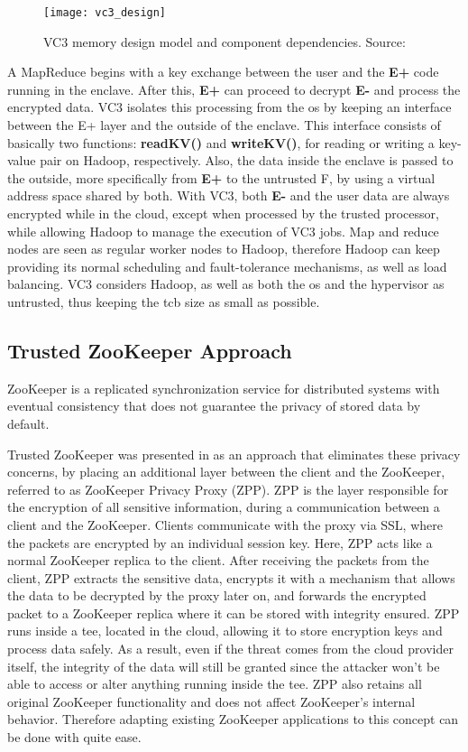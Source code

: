 \begin{figure}[tbp]
	\centering
	{\texttt{[image: vc3\_design]}}
	\caption{VC3 memory design model and component dependencies. Source: \cite{vc3Paper}}
\end{figure}

A MapReduce begins with a key exchange between the user and the \textbf{E+} code running in the enclave. After this, \textbf{E+} can proceed to decrypt \textbf{E-} and process the encrypted data. VC3 isolates this processing from the \gls{os} by keeping an interface between the E+ layer and the outside of the enclave. This interface consists of basically two functions: \textbf{readKV()} and \textbf{writeKV()}, for reading or writing a key-value pair on Hadoop, respectively. Also, the data inside the enclave is passed to the outside, more specifically from \textbf{E+} to the untrusted F, by using a virtual address space shared by both.
With VC3, both \textbf{E-} and the user data are always encrypted while in the cloud, except when processed by the trusted processor, while allowing Hadoop to manage the execution of VC3 jobs. Map and reduce nodes are seen as regular worker nodes to Hadoop, therefore Hadoop can keep providing its normal scheduling and fault-tolerance mechanisms, as well as load balancing. VC3 considers Hadoop, as well as both the \gls{os} and the hypervisor as untrusted, thus keeping the \gls{tcb} size as small as possible.

\subsection{Trusted ZooKeeper Approach}
\label{ssec:protected_zookeeper}

ZooKeeper \cite{zookeeper} is a replicated synchronization service for distributed systems with eventual consistency that does not guarantee the privacy of stored data by default. 

Trusted ZooKeeper was presented in \cite{protectedZooKeeper} as an approach that eliminates these privacy concerns, by placing an additional layer between the client and the ZooKeeper, referred to as ZooKeeper Privacy Proxy (ZPP). ZPP is the layer responsible for the encryption of all sensitive information, during a communication between a client and the ZooKeeper. 
Clients communicate with the proxy via SSL, where the packets are encrypted by an individual session key. Here, ZPP acts like a normal ZooKeeper replica to the client. 
After receiving the packets from the client, ZPP extracts the sensitive data, encrypts it with a mechanism that allows the data to be decrypted by the proxy later on, and forwards the encrypted packet to a ZooKeeper replica where it can be stored with integrity ensured.
ZPP runs inside a \gls{tee}, located in the cloud, allowing it to store encryption keys and process data safely. As a result, even if the threat comes from the cloud provider itself, the integrity of the data will still be granted since the attacker won't be able to access or alter anything running inside the \gls{tee}.
ZPP also retains all original ZooKeeper functionality and does not affect ZooKeeper's internal behavior. Therefore adapting existing ZooKeeper applications to this concept can be done with quite ease.

